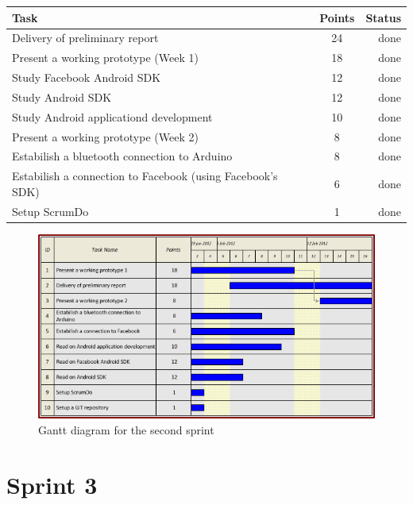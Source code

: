 \begin{table}[ht!]
\begin{tabular}{ | l | c | r | }

\hline
\textbf{Task} & \textbf{Points} & \textbf{Status} \\
\hline

Delivery of preliminary report          & 24 & done \\
\hline
Present a working prototype	(Week 1)	& 18 & done \\
\hline
Study Facebook Android SDK          & 12 & done \\
\hline
Study Android SDK               & 12 & done \\
\hline
Study Android applicationd development      & 10 & done \\
\hline
Present a working prototype	(Week 2)	& 8  & done \\
\hline
Estabilish a bluetooth connection to Arduino	& 8  & done \\
\hline
Estabilish a connection to Facebook
(using Facebook's SDK)				& 6  & done \\
\hline
Setup ScrumDo					& 1  & done \\
\hline

\end{tabular}
\end{table}

\begin{figure}[h!]
\centering \includegraphics[scale=0.8]{img/sprints-gantt2.png}
\caption{Gantt diagram for the second sprint}
\label{fig:sprints-gantt2}
\end{figure}

\newpage

\section{Sprint 3}

